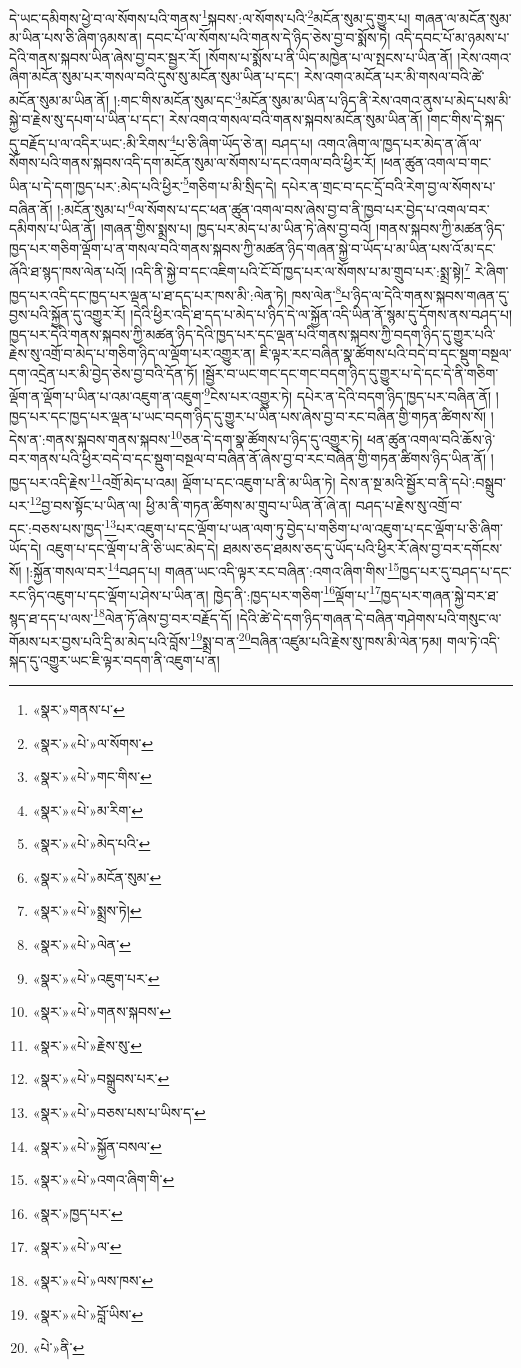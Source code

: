 དེ་ཡང་དམིགས་ཕྱེ་བ་ལ་སོགས་པའི་གནས་\footnote{«སྣར་»གནས་པ་}སྐབས་:ལ་སོགས་པའི་\footnote{«སྣར་»«པེ་»ལ་སོགས་}མངོན་སུམ་དུ་གྱུར་པ། གཞན་ལ་མངོན་སུམ་མ་ཡིན་པས་ཅི་ཞིག་ཉམས་ན། དབང་པོ་ལ་སོགས་པའི་གནས་དེ་ཉིད་ཅེས་བྱ་བ་སྨོས་ཏེ། འདི་དབང་པོ་མ་ཉམས་པ་དེའི་གནས་སྐབས་ཡིན་ཞེས་བྱ་བར་སྦྱར་རོ། །སོགས་པ་སྨོས་པ་ནི་ཡིད་མཁྱེན་པ་ལ་སྤངས་པ་ཡིན་ནོ། །རེས་འགའ་ཞིག་མངོན་སུམ་པར་གསལ་བའི་དུས་སུ་མངོན་སུམ་ཡིན་པ་དང་། རེས་འགའ་མངོན་པར་མི་གསལ་བའི་ཚེ་མངོན་སུམ་མ་ཡིན་ནོ། །:གང་གིས་མངོན་སུམ་དང་\footnote{«སྣར་»«པེ་»གང་གིས་}མངོན་སུམ་མ་ཡིན་པ་ཉིད་ནི་རེས་འགའ་ནུས་པ་མེད་པས་མི་སྐྱེ་བ་རྗེས་སུ་དཔག་པ་ཡིན་པ་དང་། རེས་འགའ་གསལ་བའི་གནས་སྐབས་མངོན་སུམ་ཡིན་ནོ། །གང་གིས་དེ་སྐད་དུ་བརྗོད་པ་ལ་འདིར་ཡང་:མི་རིགས་\footnote{«སྣར་»«པེ་»མ་རིག་}པ་ཅི་ཞིག་ཡོད་ཅེ་ན། བཤད་པ། འགའ་ཞིག་ལ་ཁྱད་པར་མེད་ན་ཞོ་ལ་སོགས་པའི་གནས་སྐབས་འདི་དག་མངོན་སུམ་ལ་སོགས་པ་དང་འགལ་བའི་ཕྱིར་རོ། །ཕན་ཚུན་འགལ་བ་གང་ཡིན་པ་དེ་དག་ཁྱད་པར་:མེད་པའི་ཕྱིར་\footnote{«སྣར་»«པེ་»མེད་པའི་}གཅིག་པ་མི་སྲིད་དེ། དཔེར་ན་གྲང་བ་དང་དྲོ་བའི་རེག་བྱ་ལ་སོགས་པ་བཞིན་ནོ། །:མངོན་སུམ་པ་\footnote{«སྣར་»«པེ་»མངོན་སུམ་}ལ་སོགས་པ་དང་ཕན་ཚུན་འགལ་བས་ཞེས་བྱ་བ་ནི་ཁྱབ་པར་བྱེད་པ་འགལ་བར་དམིགས་པ་ཡིན་ནོ། །གཞན་གྱིས་སྨྲས་པ། ཁྱད་པར་མེད་པ་མ་ཡིན་ཏེ་ཞེས་བྱ་བའོ། །གནས་སྐབས་ཀྱི་མཚན་ཉིད་ཁྱད་པར་གཅིག་ལྡོག་པ་ན་གསལ་བའི་གནས་སྐབས་ཀྱི་མཚན་ཉིད་གཞན་སྐྱེ་བ་ཡོད་པ་མ་ཡིན་པས་འོ་མ་དང་ཞོའི་ཐ་སྙད་ཁས་ལེན་པའོ། །འདི་ནི་སྐྱེ་བ་དང་འཇིག་པའི་ངོ་བོ་ཁྱད་པར་ལ་སོགས་པ་མ་གྲུབ་པར་:སྨྲ་སྟེ།\footnote{«སྣར་»«པེ་»སྨྲས་ཏེ།} རེ་ཞིག་ཁྱད་པར་འདི་དང་ཁྱད་པར་ལྡན་པ་ཐ་དད་པར་ཁས་མི་:ལེན་ཏེ། ཁས་ལེན་\footnote{«སྣར་»«པེ་»ལེན་}པ་ཉིད་ལ་དེའི་གནས་སྐབས་གཞན་དུ་བྱས་པའི་སྐྱོན་དུ་འགྱུར་རོ། །དེའི་ཕྱིར་འདི་ཐ་དད་པ་མེད་པ་ཉིད་དེ་ལ་སྐྱོན་འདི་ཡིན་ནོ་སྙམ་དུ་དོགས་ནས་བཤད་པ། ཁྱད་པར་དེའི་གནས་སྐབས་ཀྱི་མཚན་ཉིད་དེའི་ཁྱད་པར་དང་ལྡན་པའི་གནས་སྐབས་ཀྱི་བདག་ཉིད་དུ་གྱུར་པའི་རྗེས་སུ་འགྲོ་བ་མེད་པ་གཅིག་ཉིད་ལ་ལྡོག་པར་འགྱུར་ན། ཇི་ལྟར་རང་བཞིན་སྣ་ཚོགས་པའི་བདེ་བ་དང་སྡུག་བསྔལ་དག་འདྲེན་པར་མི་བྱེད་ཅེས་བྱ་བའི་དོན་ཏོ། །སྦྱོར་བ་ཡང་གང་དང་གང་བདག་ཉིད་དུ་གྱུར་པ་དེ་དང་དེ་ནི་གཅིག་ལྡོག་ན་ལྡོག་པ་ཡིན་པ་འམ་འཇུག་ན་འཇུག་\footnote{«སྣར་»«པེ་»འཇུག་པར་}ངེས་པར་འགྱུར་ཏེ། དཔེར་ན་དེའི་བདག་ཉིད་ཁྱད་པར་བཞིན་ནོ། །ཁྱད་པར་དང་ཁྱད་པར་ལྡན་པ་ཡང་བདག་ཉིད་དུ་གྱུར་པ་ཡིན་པས་ཞེས་བྱ་བ་རང་བཞིན་གྱི་གཏན་ཚིགས་སོ། །དེས་ན་:གནས་སྐབས་གནས་སྐབས་\footnote{«སྣར་»«པེ་»གནས་སྐབས་}ཅན་དེ་དག་སྣ་ཚོགས་པ་ཉིད་དུ་འགྱུར་ཏེ། ཕན་ཚུན་འགལ་བའི་ཆོས་ཉེ་བར་གནས་པའི་ཕྱིར་བདེ་བ་དང་སྡུག་བསྔལ་བ་བཞིན་ནོ་ཞེས་བྱ་བ་རང་བཞིན་གྱི་གཏན་ཚིགས་ཉིད་ཡིན་ནོ། །ཁྱད་པར་འདི་རྗེས་\footnote{«སྣར་»«པེ་»རྗེས་སུ་}འགྲོ་མེད་པ་འམ། ལྡོག་པ་དང་འཇུག་པ་ནི་མ་ཡིན་ཏེ། དེས་ན་སྔ་མའི་སྦྱོར་བ་ནི་དཔེ་:བསྒྲུབ་པར་\footnote{«སྣར་»«པེ་»བསྒྲུབས་པར་}བྱ་བས་སྟོང་པ་ཡིན་ལ། ཕྱི་མ་ནི་གཏན་ཚིགས་མ་གྲུབ་པ་ཡིན་ནོ་ཞེ་ན། བཤད་པ་རྗེས་སུ་འགྲོ་བ་དང་:བཅས་པས་ཁྱད་\footnote{«སྣར་»«པེ་»བཅས་པས་པ་ཡིས་ད་}པར་འཇུག་པ་དང་ལྡོག་པ་ཡན་ལག་ཏུ་བྱེད་པ་གཅིག་པ་ལ་འཇུག་པ་དང་ལྡོག་པ་ཅི་ཞིག་ཡོད་དེ། འཇུག་པ་དང་ལྡོག་པ་ནི་ཅི་ཡང་མེད་དེ། ཐམས་ཅད་ཐམས་ཅད་དུ་ཡོད་པའི་ཕྱིར་རོ་ཞེས་བྱ་བར་དགོངས་སོ། །:སྐྱོན་གསལ་བར་\footnote{«སྣར་»«པེ་»སྐྱོན་བསལ་}བཤད་པ། གཞན་ཡང་འདི་ལྟར་རང་བཞིན་:འགའ་ཞིག་གིས་\footnote{«སྣར་»«པེ་»འགའ་ཞིག་གི་}ཁྱད་པར་དུ་བཤད་པ་དང་རང་ཉིད་འཇུག་པ་དང་ལྡོག་པ་ཤེས་པ་ཡིན་ན། ཁྱེད་ནི་:ཁྱད་པར་གཅིག་\footnote{«སྣར་»ཁྱད་པར་}ལྡོག་པ་\footnote{«སྣར་»«པེ་»ལ་}ཁྱད་པར་གཞན་སྐྱེ་བར་ཐ་སྙད་ཐ་དད་པ་ལས་\footnote{«སྣར་»«པེ་»ལས་ཁས་}ལེན་ཏོ་ཞེས་བྱ་བར་བརྗོད་དོ། །དེའི་ཚེ་དེ་དག་ཉིད་གཞན་དེ་བཞིན་གཤེགས་པའི་གསུང་ལ་གོམས་པར་བྱས་པའི་དྲི་མ་མེད་པའི་བློས་\footnote{«སྣར་»«པེ་»བློ་ཡིས་}སྨྲ་བ་ན་\footnote{«པེ་»ནི་}བཞིན་འཛུམ་པའི་རྗེས་སུ་ཁས་མི་ལེན་ཏམ། གལ་ཏེ་འདི་སྐད་དུ་འགྱུར་ཡང་ཇི་ལྟར་བདག་ནི་འཇུག་པ་ན། 